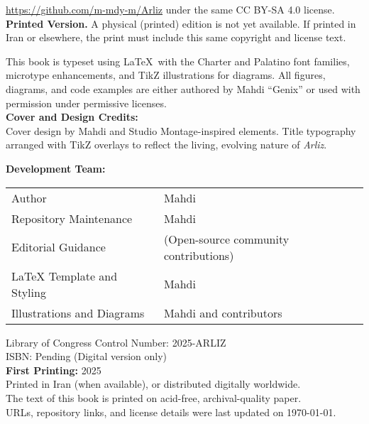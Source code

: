 \documentclass[12pt, oneside, openany]{book}
\begin{document}
\begin{center}
{		\url{https://github.com/m-mdy-m/Arliz}\newline
		under the same CC BY-SA 4.0 license.\newline
		\vspace{1.5em}
		\textbf{Printed Version.} A physical (printed) edition is not yet available. If printed in Iran or elsewhere, the print must include this same copyright and license text.\\
		\vspace{1.5em}
		{\small
			This book is typeset using \LaTeX\ with the Charter and Palatino font families, microtype enhancements, and TikZ illustrations for diagrams. All figures, diagrams, and code examples are either authored by Mahdi “Genix” or used with permission under permissive licenses.\\
			\vspace{0.5em}
			\textbf{Cover and Design Credits:}\\
			Cover design by Mahdi and Studio Montage-inspired elements. Title typography arranged with TikZ overlays to reflect the living, evolving nature of \emph{Arliz}.\\
			\newpage
		
			\textbf{Development Team:}\\
			\vspace{1.5em}
			\begin{tabular}{@{}l l@{}}
				Author                             & Mahdi\\
				Repository Maintenance             & Mahdi\\
				Editorial Guidance                 & (Open-source community contributions) \\
				LaTeX Template and Styling         & Mahdi\\
				Illustrations and Diagrams         & Mahdi and contributors \\
			\end{tabular}
		}
	}
	\end{center}
	
	\vfill
	
	\begin{flushleft}
	{\small
		Library of Congress Control Number: 2025-ARLIZ\\
		ISBN: Pending (Digital version only)\\
		\textbf{First Printing:} 2025\\
		Printed in Iran (when available), or distributed digitally worldwide.\\
		The text of this book is printed on acid-free, archival-quality paper.\\
		URLs, repository links, and license details were last updated on \today.
	}
	\end{flushleft}
\clearpage
\end{document}
